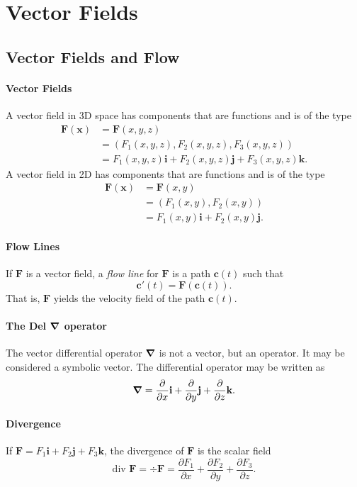 
\section{Vector Fields}
\subsection{Vector Fields and Flow}
\paragraph{Vector Fields}
A vector field in 3D space has components that are functions and is of the type 
\begin{align*}
    \textbf{F}(\textbf{x}) & = \textbf{F}(x,y,z) \\
    & = (F_1(x,y,z), F_2(x,y,z), F_3(x,y,z)) \\
    & = F_1(x,y,z)\textbf{i} + F_2(x,y,z)\textbf{j} + F_3(x,y,z)\textbf{k}.
\end{align*}
A vector field in 2D has components that are functions and is of the type 
\begin{align*}
    \textbf{F}(\textbf{x}) & = \textbf{F}(x,y) \\
    & = (F_1(x,y), F_2(x,y)) \\
    & = F_1(x,y)\textbf{i} + F_2(x,y)\textbf{j}.
\end{align*}

\paragraph{Flow Lines}
If \(\textbf{F}\) is a vector field, a \textit{flow line} for \(\textbf{F}\) is a path \(\textbf{c}(t)\) such that 
\[\textbf{c}'(t) = \textbf{F}(\textbf{c}(t)).\]
That is, \(\textbf{F}\) yields the velocity field of the path \(\textbf{c}(t)\).

\paragraph{The Del \(\grad\) operator}
The vector differential operator \(\grad\) is not a vector, but an operator. It may be considered a symbolic vector. The differential operator may be written as 
\[\grad = \frac{\partial}{\partial x}\textbf{i} + \frac{\partial}{\partial y}\textbf{j} + \frac{\partial}{\partial z}\textbf{k}.\]

\paragraph{Divergence}
If \(\textbf{F} = F_1\textbf{i} + F_2\textbf{j} + F_3\textbf{k}\), the divergence of \(\textbf{F}\) is the scalar field
\[\text{div }\textbf{F} = \div \textbf{F} = \frac{\partial F_1}{\partial x} + \frac{\partial F_2}{\partial y} + \frac{\partial F_3}{\partial z}.\]

